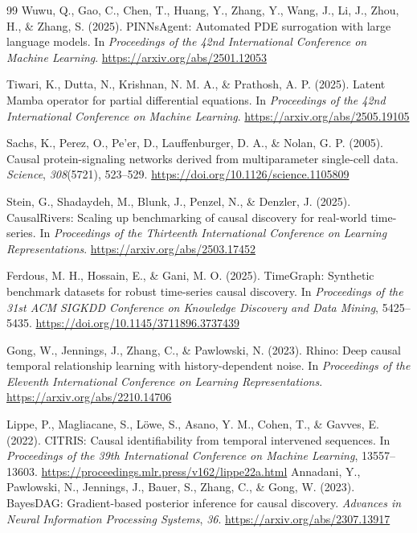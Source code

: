 \begin{thebibliography}{99}
 Wuwu, Q., Gao, C., Chen, T., Huang, Y., Zhang, Y., Wang, J., Li, J., Zhou, H., \& Zhang, S. (2025). PINNsAgent: Automated PDE surrogation with large language models. In \textit{Proceedings of the 42nd International Conference on Machine Learning}. \url{https://arxiv.org/abs/2501.12053}

 Tiwari, K., Dutta, N., Krishnan, N. M. A., \& Prathosh, A. P. (2025). Latent Mamba operator for partial differential equations. In \textit{Proceedings of the 42nd International Conference on Machine Learning}. \url{https://arxiv.org/abs/2505.19105}

 Sachs, K., Perez, O., Pe'er, D., Lauffenburger, D. A., \& Nolan, G. P. (2005). Causal protein-signaling networks derived from multiparameter single-cell data. \textit{Science}, \textit{308}(5721), 523--529. \url{https://doi.org/10.1126/science.1105809}

 Stein, G., Shadaydeh, M., Blunk, J., Penzel, N., \& Denzler, J. (2025). CausalRivers: Scaling up benchmarking of causal discovery for real-world time-series. In \textit{Proceedings of the Thirteenth International Conference on Learning Representations}. \url{https://arxiv.org/abs/2503.17452}

 Ferdous, M. H., Hossain, E., \& Gani, M. O. (2025). TimeGraph: Synthetic benchmark datasets for robust time-series causal discovery. In \textit{Proceedings of the 31st ACM SIGKDD Conference on Knowledge Discovery and Data Mining}, 5425--5435. \url{https://doi.org/10.1145/3711896.3737439}

 Gong, W., Jennings, J., Zhang, C., \& Pawlowski, N. (2023). Rhino: Deep causal temporal relationship learning with history-dependent noise. In \textit{Proceedings of the Eleventh International Conference on Learning Representations}. \url{https://arxiv.org/abs/2210.14706}

 Lippe, P., Magliacane, S., L{\"o}we, S., Asano, Y. M., Cohen, T., \& Gavves, E. (2022). CITRIS: Causal identifiability from temporal intervened sequences. In \textit{Proceedings of the 39th International Conference on Machine Learning}, 13557--13603. \url{https://proceedings.mlr.press/v162/lippe22a.html}
 Annadani, Y., Pawlowski, N., Jennings, J., Bauer, S., Zhang, C., \& Gong, W. (2023). BayesDAG: Gradient-based posterior inference for causal discovery. \textit{Advances in Neural Information Processing Systems}, \textit{36}. \url{https://arxiv.org/abs/2307.13917}


\end{thebibliography}
